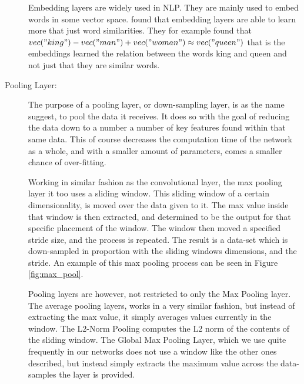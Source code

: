 \begin{description}
        Embedding layers are widely used in \gls{NLP}. They are mainly used
        to embed words in some vector space. \cite{mikolov2013linguistic}
        found that embedding layers are able to learn more that just word
        similarities. They for example found that $vec("king") - vec("man") +
        vec("woman") \approx vec("queen")$ that is the embeddings learned the
        relation between the words king and queen and not just that they are
        similar words.

    \item[Pooling Layer:]

        The purpose of a pooling layer, or down-sampling layer, is as the name
        suggest, to pool the data it receives. It does so with the goal of
        reducing the data down to a number a number of key features found within
        that same data. This of course decreases the computation time of the
        network as a whole, and with a smaller amount of parameters, comes a
        smaller chance of over-fitting.

        Working in similar fashion as the convolutional layer, the max pooling
        layer it too uses a sliding window. This sliding window of a certain
        dimensionality, is moved over the data given to it. The max value inside
        that window is then extracted, and determined to be the output for that
        specific placement of the window. The window then moved a specified
        stride size, and the process is repeated. The result is a data-set which
        is down-sampled in proportion with the sliding windows dimensions, and
        the stride. An example of this max pooling process can be seen in Figure
        \ref{fig:max_pool}.

        Pooling layers are however, not restricted to only the Max Pooling
        layer. The average pooling layers, works in a very similar fashion, but
        instead of extracting the max value, it simply averages values currently
        in the window. The L2-Norm Pooling computes the L2 norm of the contents
        of the sliding window. The Global Max Pooling Layer, which we use quite
        frequently in our networks does not use a window like the other ones
        described, but instead simply extracts the maximum value across the
        data-samples the layer is provided.


\end{description}
